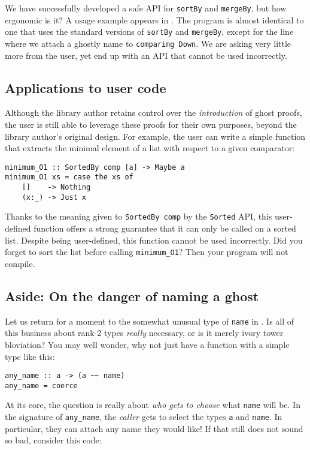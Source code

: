 \documentclass[format=sigplan, review=false, screen=true]{acmart}
\begin{document}
We have successfully developed a safe API for \texttt{sortBy} and \texttt{mergeBy}, but how ergonomic
is it? A usage example appears in . The program is almost identical to one
that uses the standard versions of \texttt{sortBy} and \texttt{mergeBy}, except for the line where
we attach a ghostly name to \texttt{comparing Down}. We are asking very little more from the user,
yet end up with an API that cannot be used incorrectly.

\subsection{Applications to user code}
Although the library author retains control over the \emph{introduction} of ghost proofs, the
user is still able to leverage these proofs for their own purposes, beyond the library author's original
design. For example, the user can write a simple function that extracts the minimal element of
a list with respect to a given comparator:
\begin{verbatim}
minimum_O1 :: SortedBy comp [a] -> Maybe a
minimum_O1 xs = case the xs of
    []    -> Nothing
    (x:_) -> Just x
\end{verbatim}
Thanks to the meaning given to \texttt{SortedBy comp} by the \texttt{Sorted} API, this user-defined
function offers a strong guarantee that it can only be called on a sorted list. Despite being user-defined,
this function cannot be used incorrectly. Did you forget to sort the list before calling \texttt{minimum\_O1}?
Then your program will not compile.

\subsection{Aside: On the danger of naming a ghost}\label{ghost-danger}

Let us return for a moment to the somewhat unusual type of \texttt{name} in .
Is all of this business about rank-2 types \emph{really} necessary, or is it merely ivory tower
bloviation?  You may well wonder, why not just have a function with a simple type like this:

\begin{verbatim}
any_name :: a -> (a ~~ name)
any_name = coerce
\end{verbatim}

At its core, the question is really about \emph{who gets to choose} what \texttt{name} will be.
In the signature of \texttt{any\_name}, the \emph{caller} gets to select the types \texttt{a}
and \texttt{name}. In particular, they can attach any name they would like!
If that still does not sound so bad, consider this code:
\end{document}
